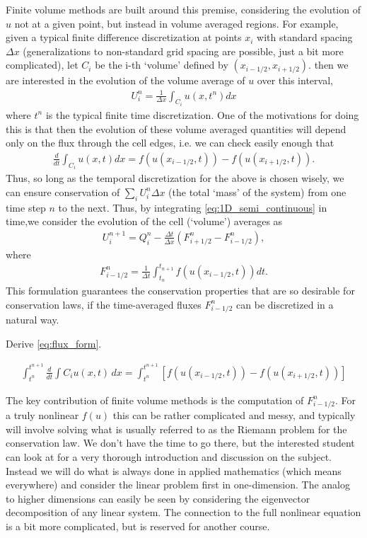 Finite volume methods are built around this premise, considering the evolution of $u$ not at a given point, but instead in volume averaged regions.  For example, given a typical finite difference discretization at points $x_i$ with standard spacing $\Delta x$ (generalizations to non-standard grid spacing are possible, just a bit more complicated), let $C_i$ be the i-th `volume' defined by $(x_{i-1/2},x_{i+1/2})$. then we are interested in the evolution of the volume average of $u$ over this interval,
\begin{gather}
U_i^n  = \frac{1}{\Delta x}\int_{C_i} u(x,t^n)dx
\end{gather}
where $t^n$ is the typical finite time discretization.  One of the motivations for doing this is that then the evolution of these volume averaged quantities will depend only on the flux through the cell edges, i.e. we can check easily enough that
\begin{gather}\label{eq:1D_semi_continuous}
\frac{d}{dt}\int_{C_i} u(x,t) dx = f(u(x_{i-1/2},t))-f(u(x_{i+1/2},t)).
\end{gather}
Thus, so long as the temporal discretization for the above is chosen wisely, we can ensure conservation of $\sum_i U_i^n\Delta x$ (the total `mass' of the system) from one time step $n$ to the next.  Thus, by integrating \eqref{eq:1D_semi_continuous} in time,we consider the evolution of the cell (`volume') averages as
\begin{gather}\label{eq:flux_form}
U_i^{n+1} = Q_i^n - \frac{\Delta t}{\Delta x} \left(F^n_{i+1/2}-F^n_{i-1/2}\right),
\end{gather}
where
\begin{gather}
F_{i-1/2}^n = \frac{1}{\Delta t} \int_{t_n}^{t_{n+1}}f(u(x_{i-1/2},t))dt. 
\end{gather}
This formulation guarantees the conservation properties that are so desirable for conservation laws, if the time-averaged fluxes $F_{i-1/2}^n$ can be discretized in a natural way.

\begin{problem}
Derive \eqref{eq:flux_form}.

\begin{align*}
\int_{t^n}^{t^{n+1}} \frac{d}{dt}\int{C_i} u(x,t)\, dx = \int_{t^n}^{t^{n+1}} \left[ f(u(x_{i-1/2},t)) - f(u(x_{i+1/2},t)) \right]
\end{align*}
\end{problem}

The key contribution of finite volume methods is the computation of $F_{i-1/2}^n$.  For a truly nonlinear $f(u)$ this can be rather complicated and messy, and typically will involve solving what is usually referred to as the Riemann problem for the conservation law.  We don't have the time to go there, but the interested student can look at \cite{Le2002} for a very thorough introduction and discussion on the subject.  Instead we will do what is always done in applied mathematics (which means everywhere) and consider the linear problem first in one-dimension.  The analog to higher dimensions can easily be seen by considering the eigenvector decomposition of any linear system.  The connection to the full nonlinear equation is a bit more complicated, but is reserved for another course.

